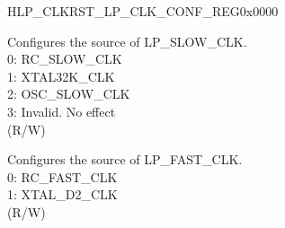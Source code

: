 \begin{register}{H}{LP\_CLKRST\_LP\_CLK\_CONF\_REG}{0x0000}\label{regdesc:LPCLKRSTLPCLKCONFREG}
%
%
%
\regnewline%
\begin{regdesc}\begin{reglist}
\label{fielddesc:LPCLKRSTSLOWCLKSEL}\item [LP\_CLKRST\_SLOW\_CLK\_SEL] Configures the source of LP\_SLOW\_CLK.\\
0: RC\_SLOW\_CLK \\
1: XTAL32K\_CLK \\
2: OSC\_SLOW\_CLK\\
3: Invalid. No effect \\
 (R/W)
\label{fielddesc:LPCLKRSTFASTCLKSEL}\item [LP\_CLKRST\_FAST\_CLK\_SEL] Configures the source of LP\_FAST\_CLK.\\
0: RC\_FAST\_CLK \\
1: XTAL\_D2\_CLK  \\ (R/W)
\end{reglist}\end{regdesc}
\end{register}



